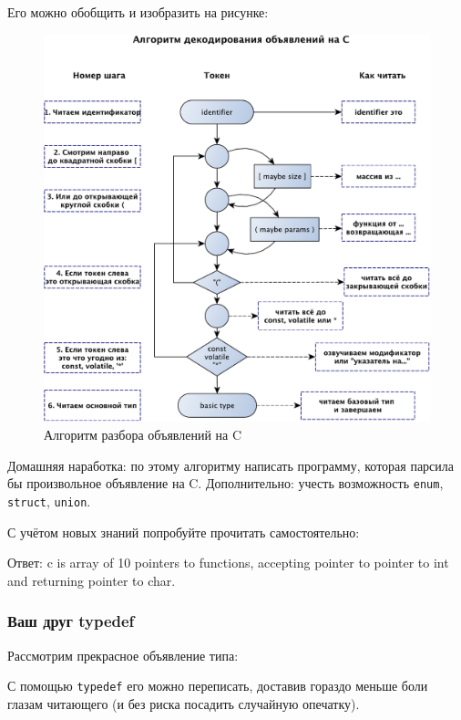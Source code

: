 \documentclass[a4paper,12pt,oneside]{article}
\begin{document}
Его можно обобщить и изобразить на рисунке:
\begin{figure}[h!]
\centering
\includegraphics[width=1.0\textwidth]{illustrations/cdecls-crop.pdf}
\caption{Алгоритм разбора объявлений на C}
\label{fig:cdecl_parse}
\end{figure}

Домашняя наработка: по этому алгоритму написать программу, которая парсила бы произвольное объявление на C. Дополнительно: учесть возможность \lstinline!enum!, \lstinline!struct!, \lstinline!union!.

С учётом новых знаний попробуйте прочитать самостоятельно:



Ответ: c is array of 10 pointers to functions, accepting pointer to pointer to int and returning pointer to char.

\subsubsection{Ваш друг typedef}

Рассмотрим прекрасное объявление типа:



С помощью \lstinline!typedef! его можно переписать, доставив гораздо меньше боли глазам читающего (и без риска посадить случайную опечатку).
\end{document}
